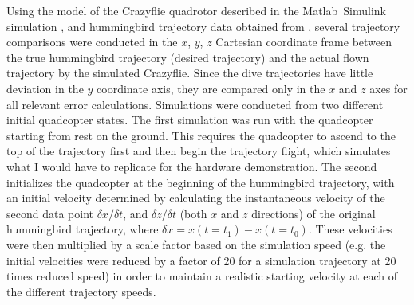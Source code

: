 \documentclass[onecolumn,10pt]{IEEEtran}
\newcommand{\MATLAB}{Matlab}
\begin{document}
Using the model of the Crazyflie quadrotor described in the 
\MATLAB\ Simulink simulation \cite{hartman2014quadcopter},
and hummingbird trajectory data obtained from \cite{clark2009courtship}, several trajectory comparisons were conducted in the $x$, $y$, $z$ Cartesian coordinate frame between the true hummingbird trajectory (desired trajectory) and the actual flown trajectory by the simulated Crazyflie. Since the dive trajectories have little deviation in the $y$ coordinate axis, they are compared only in the $x$ and $z$ axes for all relevant error calculations. 
Simulations were conducted from two different initial quadcopter states. The first simulation was run with the quadcopter starting from rest on the ground. This requires the quadcopter to ascend to the top of the trajectory first and then begin the trajectory flight, which simulates what I would have to replicate for the hardware demonstration. The second initializes the quadcopter at the beginning of the hummingbird trajectory, with an initial velocity determined by calculating the instantaneous velocity of the second data point $\delta x/\delta t$, and $\delta z/\delta t$ (both $x$ and $z$ directions) of the original hummingbird trajectory, where $\delta x = x(t = t_1) - x(t = t_0)$. These velocities were then multiplied by a scale factor based on the simulation speed (e.g. the initial velocities were reduced by a factor of 20 for a simulation trajectory at 20 times reduced speed) in order to maintain a realistic starting velocity at each of the different trajectory speeds.
\end{document}
